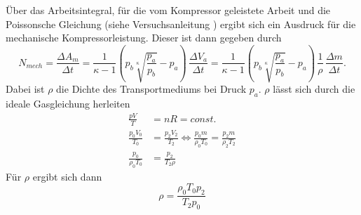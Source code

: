 Über das Arbeitsintegral, für die vom Kompressor geleistete Arbeit und die Poissonsche Gleichung (siehe Versuchsanleitung \cite{versuchsbeschreibung})
ergibt sich ein Ausdruck für die mechanische Kompressorleistung. Dieser ist dann gegeben durch
\begin{equation}
    \label{mechLeistung}
    N_{mech} = \frac{ΔA_m}{Δt} = \frac{1}{κ - 1}\left(p_b\sqrt[κ]{\frac{p_a}{p_b}} - p_a\right) \, \frac{ΔV_a}{Δt} 
    = \frac{1}{κ - 1}\left(p_b\sqrt[κ]{\frac{p_a}{p_b}} - p_a\right)\,\frac{1}{ρ}\,\frac{Δm}{Δt}.
\end{equation}
Dabei ist $\rho$ die Dichte des Transportmediums bei Druck $p_a$. $\rho$ lässt sich durch die ideale Gasgleichung herleiten
\begin{align}
    \frac{pV}{T} &= nR = const.\\
    \frac{p_0V_0}{T_0} &= \frac{p_2V_2}{T_2} \Leftrightarrow \frac{p_0m}{ρ_0T_0} = \frac{p_2m}{ρ_2T_2}\\
    \frac{p_0}{ρ_0T_0} &= \frac{p_2}{T_2ρ} 
\end{align}
Für $\rho$ ergibt sich dann
\begin{equation}\label{eqn:roh}
    ρ = \frac{ρ_0T_0p_2}{T_2p_0}
\end{equation}